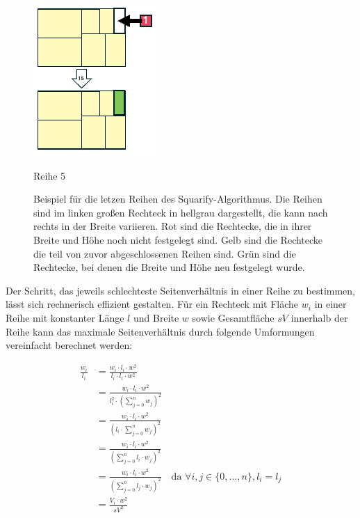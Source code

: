 \begin{figure}
    \begin{minipage}{0.4\textwidth}
        \centering
        \includegraphics[width=0.7\linewidth]{images/squarify_example_5.png}
        \caption*{Reihe 5}
    \end{minipage}
    
    \caption{Beispiel für die letzen Reihen des Squarify-Algorithmus. Die Reihen sind im linken großen Rechteck in hellgrau dargestellt, die kann nach rechts in der Breite variieren. Rot sind die Rechtecke, die in ihrer Breite und Höhe noch nicht festgelegt sind. Gelb sind die Rechtecke die teil von zuvor abgeschlossenen Reihen sind. Grün sind die Rechtecke, bei denen die Breite und Höhe neu festgelegt wurde.}
    \label{fig:squarify_examples}
\end{figure}


\smallskip

Der Schritt, das jeweils schlechteste Seitenverhältnis in einer Reihe zu bestimmen, lässt sich rechnerisch effizient gestalten. Für ein Rechteck mit Fläche $w_i$ in einer Reihe mit konstanter Länge $l$ und Breite $w$ sowie Gesamtfläche $sV$ innerhalb der Reihe kann das maximale Seitenverhältnis durch folgende Umformungen vereinfacht berechnet werden:

\begin{align}
    \frac{w_i}{l_i} 
    &= \frac{w_i \cdot l_i \cdot w^2}{l_i \cdot l_i \cdot w^2} \\
    &= \frac{w_i \cdot l_i \cdot w^2}{l_i^2 \cdot \left(\sum_{j=0}^{n} w_j\right)^2} \\
    &= \frac{w_i \cdot l_i \cdot w^2}{\left(l_i \cdot \sum_{j=0}^{n} w_j\right)^2} \\
    &= \frac{w_i \cdot l_i \cdot w^2}{\left(\sum_{j=0}^{n} l_i \cdot w_j\right)^2} \\
    &= \frac{w_i \cdot l_i \cdot w^2}{\left(\sum_{j=0}^{n} l_j \cdot w_j\right)^2}
    \quad\text{da } \forall i, j \in \{0, \dots, n\}, l_i = l_j \\
    &= \frac{V_i \cdot w^2}{sV^2}
\end{align}

